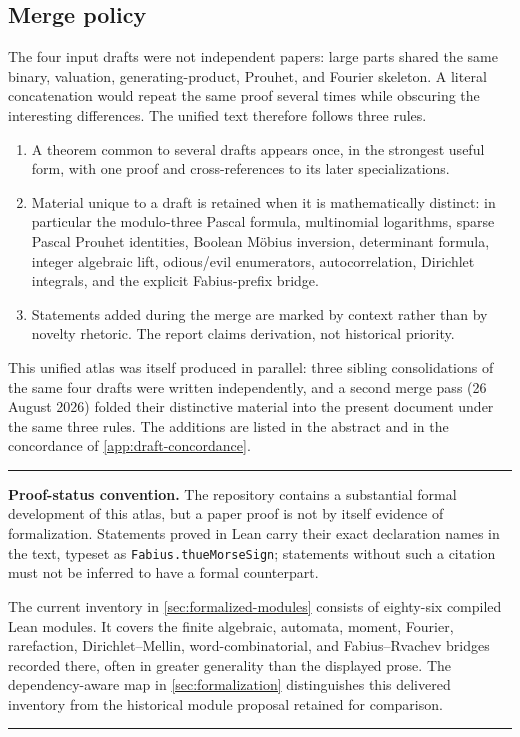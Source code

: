 \documentclass[11pt,oneside]{article}
\numberwithin{equation}{section}
\theoremstyle{definition}
\theoremstyle{remark}
\newcommand{\lean}[1]{%
  \ifmmode\text{\nolinkurl{#1}}\else\nolinkurl{#1}\fi}
\newenvironment{boxedremark}{%
  \par\smallskip\noindent\begin{center}\begin{minipage}{0.94\textwidth}%
  \color{black}\hrule\vspace{0.6em}\small
}{%
  \vspace{0.6em}\hrule\end{minipage}\end{center}\smallskip
}
\begin{document}
\subsection{Merge policy}

The four input drafts were not independent papers: large parts shared the same
binary, valuation, generating-product, Prouhet, and Fourier skeleton.  A literal
concatenation would repeat the same proof several times while obscuring the
interesting differences.  The unified text therefore follows three rules.

\begin{enumerate}
\item A theorem common to several drafts appears once, in the strongest useful
      form, with one proof and cross-references to its later specializations.
\item Material unique to a draft is retained when it is mathematically distinct:
      in particular the modulo-three Pascal formula, multinomial logarithms,
      sparse Pascal Prouhet identities, Boolean M\"obius inversion, determinant
      formula, integer algebraic lift, odious/evil enumerators, autocorrelation,
      Dirichlet integrals, and the explicit Fabius-prefix bridge.
\item Statements added during the merge are marked by context rather than by
      novelty rhetoric.  The report claims derivation, not historical priority.
\end{enumerate}

This unified atlas was itself produced in parallel: three sibling
consolidations of the same four drafts were written independently, and a
second merge pass (26 August 2026) folded their distinctive material into the
present document under the same three rules.  The additions are listed in the
abstract and in the concordance of \cref{app:draft-concordance}.

\begin{boxedremark}
\textbf{Proof-status convention.}
The repository contains a substantial formal development of this atlas, but a paper proof
is not by itself evidence of formalization.  Statements proved in Lean carry their exact
declaration names in the text, typeset as \lean{Fabius.thueMorseSign}; statements without
such a citation must not be inferred to have a formal counterpart.

The current inventory in \cref{sec:formalized-modules} consists of eighty-six compiled
Lean modules.  It covers the finite algebraic, automata, moment, Fourier, rarefaction,
Dirichlet--Mellin, word-combinatorial, and Fabius--Rvachev bridges recorded there, often in
greater generality than the displayed prose.  The dependency-aware map in
\cref{sec:formalization} distinguishes this delivered inventory from the historical module
proposal retained for comparison.
\end{boxedremark}
\end{document}
